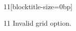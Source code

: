 \documentclass[paper=A4]{ropas-poster}
\begin{document}
\begin{postergrid}{1}{1}[blocktitle-size=0bp]
\begin{posterblock}{1}{1}
Invalid grid option.
\end{posterblock}
\end{postergrid}
\end{document}
